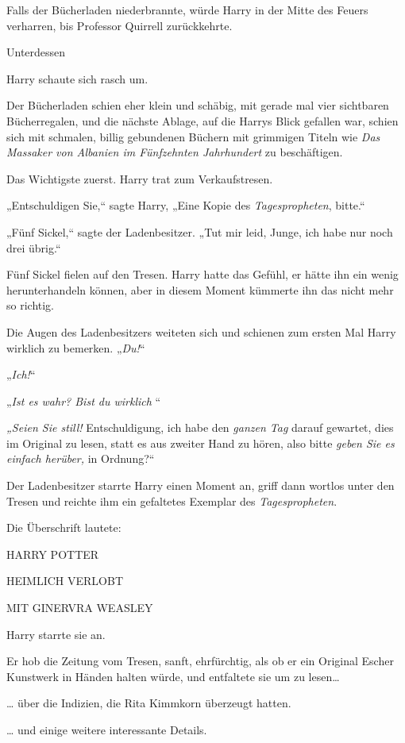 {Falls der Bücherladen niederbrannte, würde Harry in der Mitte des Feuers verharren, bis Professor Quirrell zurückkehrte.

Unterdessen \later

Harry schaute sich rasch um.

Der Bücherladen schien eher klein und schäbig, mit gerade mal vier sichtbaren Bücherregalen, und die nächste Ablage, auf die Harrys Blick gefallen war, schien sich mit schmalen, billig gebundenen Büchern mit grimmigen Titeln wie \emph{Das Massaker von Albanien im Fünfzehnten Jahrhundert} zu beschäftigen.

Das Wichtigste zuerst. Harry trat zum Verkaufstresen.

„Entschuldigen Sie,“ sagte Harry, „Eine Kopie des \emph{Tagespropheten}, bitte.“

„Fünf Sickel,“ sagte der Ladenbesitzer. „Tut mir leid, Junge, ich habe nur noch drei übrig.“

Fünf Sickel fielen auf den Tresen. Harry hatte das Gefühl, er hätte ihn ein wenig herunterhandeln können, aber in diesem Moment kümmerte ihn das nicht mehr so richtig.

Die Augen des Ladenbesitzers weiteten sich und schienen zum ersten Mal Harry wirklich zu bemerken. „\emph{Du!}“

„\emph{Ich!}“

„\emph{Ist es wahr? Bist du wirklich \later}“

\emph{„Seien Sie still!} Entschuldigung, ich habe den \emph{ganzen Tag} darauf gewartet, dies im Original zu lesen, statt es aus zweiter Hand zu hören, also bitte \emph{geben Sie es einfach herüber,} in Ordnung?“

Der Ladenbesitzer starrte Harry einen Moment an, griff dann wortlos unter den Tresen und reichte ihm ein gefaltetes Exemplar des \emph{Tagespropheten}.

Die Überschrift lautete:

HARRY POTTER

HEIMLICH VERLOBT

MIT GINERVRA WEASLEY

Harry starrte sie an.

Er hob die Zeitung vom Tresen, sanft, ehrfürchtig, als ob er ein Original Escher Kunstwerk in Händen halten würde, und entfaltete sie um zu lesen…

… über die Indizien, die Rita Kimmkorn überzeugt hatten.

… und einige weitere interessante Details.

}
